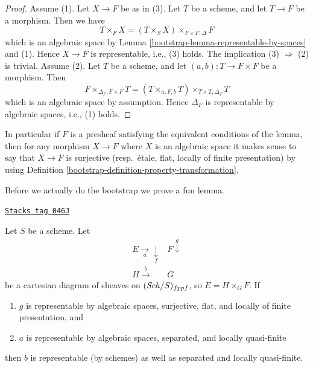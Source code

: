 \begin{proof}

Assume (1). Let $X \to F$ be as in (3). Let $T$ be a scheme, and let
$T \to F$ be a morphism. Then we have
$$
T \times_F X = (T \times_S X) \times_{F \times F, \Delta} F
$$
which is an algebraic space by
Lemma \ref{bootstrap-lemma-representable-by-spaces}
and (1). Hence $X \to F$ is representable, i.e., (3) holds.
The implication (3) $\Rightarrow$ (2) is trivial. Assume (2).
Let $T$ be a scheme, and let $(a, b) : T \to F \times F$ be a morphism.
Then
$$
F \times_{\Delta_F, F \times F} T =
(T \times_{a, F, b} T) \times_{T \times T, \Delta_T} T
$$
which is an algebraic space by assumption. Hence $\Delta_F$ is
representable by algebraic spaces, i.e., (1) holds.
\end{proof}

In particular if $F$ is a presheaf satisfying the equivalent conditions of
the lemma, then for any morphism $X \to F$ where $X$ is an algebraic space
it makes sense to say that $X \to F$ is surjective (resp.\ \'etale, flat,
locally of finite presentation) by using
Definition \ref{bootstrap-definition-property-transformation}.

\medskip\noindent
Before we actually do the bootstrap we prove a fun lemma.

\begin{lemma}
\label{bootstrap-lemma-after-fppf-sep-lqf}
\href{https://stacks.math.columbia.edu/tag/046J}{\texttt{Stacks tag 046J}}

Let $S$ be a scheme.
Let
$$
\begin{array}{cc}E \underset{a}{\longrightarrow}\underset{f}{\downarrow} & F \overset{g}{\downarrow} \\ H \overset{b}{\longrightarrow} & G\end{array}
$$
be a cartesian diagram of sheaves on $(\mathit{Sch}/S)_{fppf}$, so
$E = H \times_G F$. If
\begin{enumerate}
\item $g$ is representable by algebraic spaces, surjective, flat, and
locally of finite presentation, and
\item $a$ is representable by algebraic spaces, separated, and
locally quasi-finite
\end{enumerate}
then $b$ is representable (by schemes) as well as separated and
locally quasi-finite.
\end{lemma}

